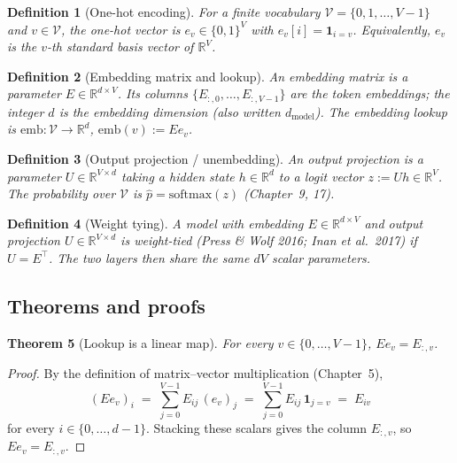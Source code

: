 \documentclass[11pt]{article}
\newtheorem{theorem}{Theorem}[section]
\newtheorem{definition}[theorem]{Definition}
\theoremstyle{remark}
\begin{document}
\begin{definition}[One-hot encoding]
For a finite vocabulary $\mathcal{V}=\{0,1,\dots,V-1\}$ and $v\in\mathcal{V}$, the \emph{one-hot vector} is $e_v\in\{0,1\}^V$ with $e_v[i]=\mathbf{1}_{i=v}$. Equivalently, $e_v$ is the $v$-th standard basis vector of $\mathbb{R}^V$.
\end{definition}

\begin{definition}[Embedding matrix and lookup]
An \emph{embedding matrix} is a parameter $E\in\mathbb{R}^{d\times V}$. Its columns $\{E_{:,0},\dots,E_{:,V-1}\}$ are the \emph{token embeddings}; the integer $d$ is the \emph{embedding dimension} (also written $d_{\mathrm{model}}$). The \emph{embedding lookup} is $\mathrm{emb}\colon\mathcal{V}\to\mathbb{R}^d$, $\mathrm{emb}(v):=E e_v$.
\end{definition}

\begin{definition}[Output projection / unembedding]
An \emph{output projection} is a parameter $U\in\mathbb{R}^{V\times d}$ taking a hidden state $h\in\mathbb{R}^d$ to a logit vector $z:=Uh\in\mathbb{R}^V$. The probability over $\mathcal{V}$ is $\hat p=\mathrm{softmax}(z)$ (Chapter~9, 17).
\end{definition}

\begin{definition}[Weight tying]
A model with embedding $E\in\mathbb{R}^{d\times V}$ and output projection $U\in\mathbb{R}^{V\times d}$ is \emph{weight-tied} (Press \& Wolf 2016; Inan et al.\ 2017) if $U=E^\top$. The two layers then share the same $dV$ scalar parameters.
\end{definition}

\subsection*{Theorems and proofs}

\begin{theorem}[Lookup is a linear map]\label{thm:lookup}
For every $v\in\{0,\dots,V-1\}$, $E e_v = E_{:,v}$.
\end{theorem}

\begin{proof}
By the definition of matrix--vector multiplication (Chapter~5),
\[
(E e_v)_i \;=\; \sum_{j=0}^{V-1} E_{ij}\,(e_v)_j \;=\; \sum_{j=0}^{V-1} E_{ij}\,\mathbf{1}_{j=v} \;=\; E_{iv}
\]
for every $i\in\{0,\dots,d-1\}$. Stacking these scalars gives the column $E_{:,v}$, so $Ee_v=E_{:,v}$.
\end{proof}
\end{document}
